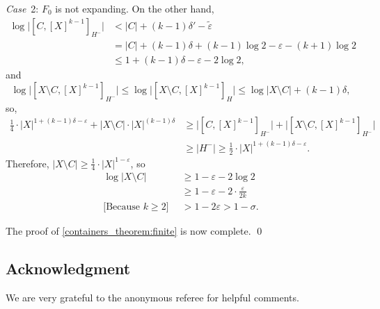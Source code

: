 \documentclass[12pt,reqno]{amsart}
\theoremstyle{plain}
\theoremstyle{definition}
\theoremstyle{remark}
\newenvironment{case}[2]{\smallskip\par\noindent \textit{Case}~#1: \rmfamily #2.}{}
\newcommand{\0}{\mathbb{\emptyset}}
\newcommand{\de}{\delta}
\newcommand{\e}{\varepsilon}
\newcommand{\si}{\sigma}
\newcommand{\eqcomment}[2][6pt]{\Big[\text{#2}\Big] \hspace{#1}}
\begin{document}
\begin{case}{2}{$F_0$ is not expanding}
	On the other hand,
	\begin{align*}
	\log \big|[C, [X]^{k-1}]_{H^-}\big| 
	&< 
	|C| + (k-1) \de' - \tilde\e 
	\\
	&= 
	|C| + (k-1) \de + (k-1) \log 2 - \e - (k + 1) \log 2 
	\\
	&\leq 1 + (k-1) \de - \e - 2 \log 2,
	\end{align*}
	and
	\[
	\log \big|[X \setminus C, [X]^{k-1}]_{H^-}\big| \le \log \big|[X \setminus C, [X]^{k-1}]_{H}\big| \le \log |X \setminus C| + (k-1) \de,
	\]
	so, 
	\begin{align*}
	\frac{1}{4} \cdot |X|^{1 + (k-1) \de - \e} + |X \setminus C| \cdot |X|^{(k-1) \de}
	&\ge 
	\big|[C, [X]^{k-1}]_{H^-}\big| + \big|[X \setminus C, [X]^{k-1}]_{H^-}\big|
	\\
	&\ge |H^-| 
	\ge 
	\frac{1}{2}\cdot |X|^{1 + (k-1) \de - \e}.
	\end{align*}
	Therefore, $|X \setminus C| \ge \frac{1}{4} \cdot |X|^{1 - \e}$, so 
	\begin{align*}
	\log |X \setminus C| 
	&\ge 
	1 - \e - 2 \log 2 
	\\
	&\ge 
	1 - \e - 2 \cdot \frac{\e}{2k}
	\\ 
	\eqcomment{Because $k \ge 2$}
	&> 
	1 - 2 \e > 1 - \si.
	\end{align*}
\end{case}

\medskip

The proof of \cref{containers_theorem:finite} is now complete. \hfill\qed


\subsection*{Acknowledgment} We are very grateful to the anonymous referee for helpful comments.
\end{document}
